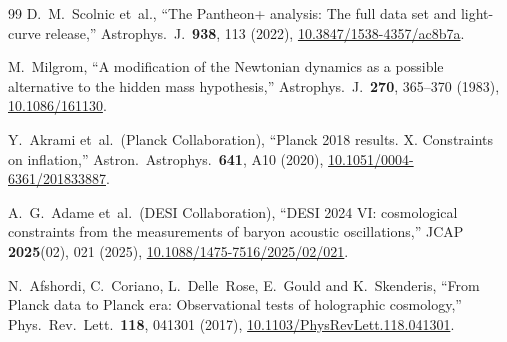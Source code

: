 \documentclass[aps,prd,twocolumn,superscriptaddress,nofootinbib]{revtex4-2}
\begin{document}
\begin{thebibliography}{99}
D.~M.~Scolnic et~al.,
``The Pantheon+ analysis: The full data set and light-curve release,''
Astrophys.\ J.\ \textbf{938}, 113 (2022),
\href{https://doi.org/10.3847/1538-4357/ac8b7a}{10.3847/1538-4357/ac8b7a}.

M.~Milgrom,
``A modification of the Newtonian dynamics as a possible alternative to the hidden mass hypothesis,''
Astrophys.\ J.\ \textbf{270}, 365--370 (1983),
\href{https://doi.org/10.1086/161130}{10.1086/161130}.


Y.~Akrami et~al.\ (Planck Collaboration),
``Planck 2018 results. X. Constraints on inflation,''
Astron.\ Astrophys.\ \textbf{641}, A10 (2020),
\href{https://doi.org/10.1051/0004-6361/201833887}{10.1051/0004-6361/201833887}.

A.~G.~Adame et~al.\ (DESI Collaboration),
``DESI 2024 VI: cosmological constraints from the measurements of baryon acoustic oscillations,''
JCAP \textbf{2025}(02), 021 (2025),
\href{https://doi.org/10.1088/1475-7516/2025/02/021}{10.1088/1475-7516/2025/02/021}.

N.~Afshordi, C.~Coriano, L.~Delle~Rose, E.~Gould and K.~Skenderis,
``From Planck data to Planck era: Observational tests of holographic cosmology,''
Phys.\ Rev.\ Lett.\ \textbf{118}, 041301 (2017),
\href{https://doi.org/10.1103/PhysRevLett.118.041301}{10.1103/PhysRevLett.118.041301}.

\end{thebibliography}
\end{document}
